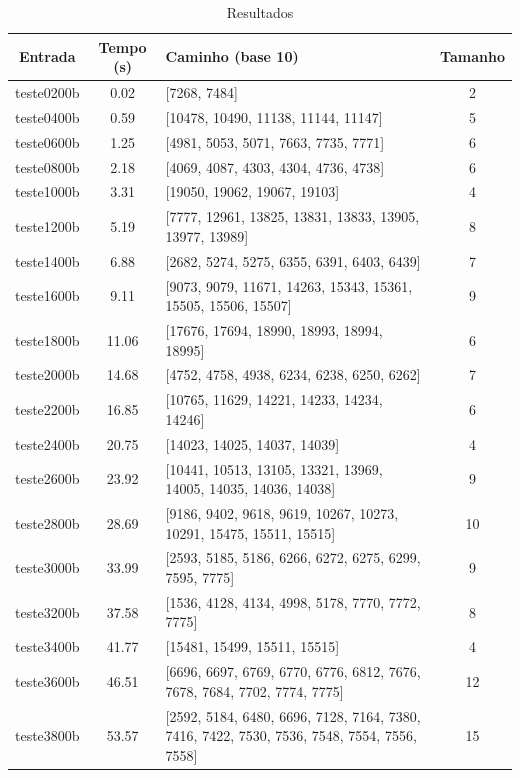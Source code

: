\documentclass[12pt]{article}
\begin{document}
\begin{table}[h]
\caption{Resultados}
\label{tab:resultados-1}
\begin{tabular}{c | c || p{9cm} | c}
  Entrada & Tempo (s) & Caminho (base 10) & Tamanho \\
  \hline \hline
  teste0200b & 0.02 & [7268, 7484] & 2 \\
  \hline
  teste0400b & 0.59 & [10478, 10490, 11138, 11144, 11147] & 5 \\
  \hline
  teste0600b & 1.25 & [4981, 5053, 5071, 7663, 7735, 7771] & 6 \\
  \hline
  teste0800b & 2.18 & [4069, 4087, 4303, 4304, 4736, 4738] & 6 \\
  \hline
  teste1000b & 3.31 & [19050, 19062, 19067, 19103] & 4 \\
  \hline
  teste1200b & 5.19 & [7777, 12961, 13825, 13831, 13833, 13905, 13977, 13989] & 8 \\
  \hline
  teste1400b & 6.88 & [2682, 5274, 5275, 6355, 6391, 6403, 6439] & 7 \\
  \hline
  teste1600b & 9.11 & [9073, 9079, 11671, 14263, 15343, 15361, 15505, 15506, 15507] & 9 \\
  \hline
  teste1800b & 11.06 & [17676, 17694, 18990, 18993, 18994, 18995] & 6 \\
  \hline
  teste2000b & 14.68 & [4752, 4758, 4938, 6234, 6238, 6250, 6262] & 7 \\
  \hline
  teste2200b & 16.85 & [10765, 11629, 14221, 14233, 14234, 14246] & 6 \\
  \hline
  teste2400b & 20.75 & [14023, 14025, 14037, 14039] & 4 \\
  \hline
  teste2600b & 23.92 & [10441, 10513, 13105, 13321, 13969, 14005, 14035, 14036, 14038] & 9 \\
  \hline
  teste2800b & 28.69 & [9186, 9402, 9618, 9619, 10267, 10273, 10291, 15475, 15511, 15515] & 10 \\
  \hline
  teste3000b & 33.99 & [2593, 5185, 5186, 6266, 6272, 6275, 6299, 7595, 7775] & 9 \\
  \hline
  teste3200b & 37.58 & [1536, 4128, 4134, 4998, 5178, 7770, 7772, 7775] & 8 \\
  \hline
  teste3400b & 41.77 & [15481, 15499, 15511, 15515] & 4 \\
  \hline
  teste3600b & 46.51 & [6696, 6697, 6769, 6770, 6776, 6812, 7676, 7678, 7684, 7702, 7774, 7775] & 12 \\
  \hline
  teste3800b & 53.57 & [2592, 5184, 6480, 6696, 7128, 7164, 7380, 7416, 7422, 7530, 7536, 7548, 7554, 7556, 7558] & 15 \\

\end{tabular}
\end{table}
\end{document}
